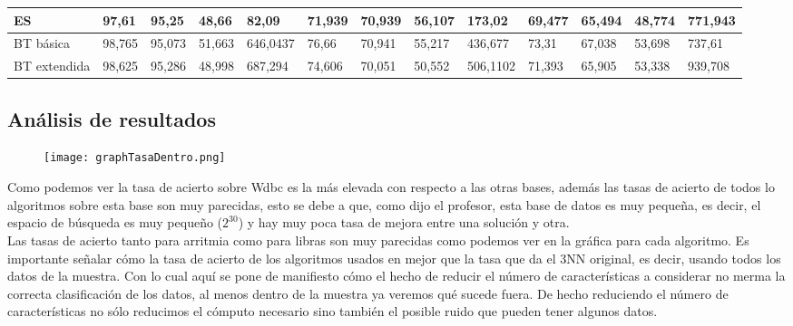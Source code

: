 \documentclass[10pt,a4paper]{article}
\begin{document}
\begin{table}[H]
{\begin{tabular}{lllllllllllll}
\multicolumn{1}{|l|}{ES}                       & \multicolumn{1}{l|}{97,61}         & \multicolumn{1}{l|}{95,25}   & \multicolumn{1}{l|}{48,66}  & \multicolumn{1}{l|}{82,09}        & \multicolumn{1}{l|}{71,939}        & \multicolumn{1}{l|}{70,939}  & \multicolumn{1}{l|}{56,107} & \multicolumn{1}{l|}{173,02}       & \multicolumn{1}{l|}{69,477}        & \multicolumn{1}{l|}{65,494}  & \multicolumn{1}{l|}{48,774} & \multicolumn{1}{l|}{771,943} \\ \hline
\multicolumn{1}{|l|}{BT básica}                & \multicolumn{1}{l|}{98,765}        & \multicolumn{1}{l|}{95,073}  & \multicolumn{1}{l|}{51,663} & \multicolumn{1}{l|}{646,0437}     & \multicolumn{1}{l|}{76,66}         & \multicolumn{1}{l|}{70,941}  & \multicolumn{1}{l|}{55,217} & \multicolumn{1}{l|}{436,677}      & \multicolumn{1}{l|}{73,31}         & \multicolumn{1}{l|}{67,038}  & \multicolumn{1}{l|}{53,698} & \multicolumn{1}{l|}{737,61}  \\ \hline
\multicolumn{1}{|l|}{BT extendida}             & \multicolumn{1}{l|}{98,625}        & \multicolumn{1}{l|}{95,286}  & \multicolumn{1}{l|}{48,998} & \multicolumn{1}{l|}{687,294}      & \multicolumn{1}{l|}{74,606}        & \multicolumn{1}{l|}{70,051}  & \multicolumn{1}{l|}{50,552} & \multicolumn{1}{l|}{506,1102}     & \multicolumn{1}{l|}{71,393}        & \multicolumn{1}{l|}{65,905}  & \multicolumn{1}{l|}{53,338} & \multicolumn{1}{l|}{939,708} \\ \hline
\end{tabular}}
\end{table}

\subsection{\color[rgb]{0.0,0.0,0.51}Análisis de resultados}

\begin{figure}[H]
\centering
\texttt{[image: graphTasaDentro.png]}
\end{figure}

Como podemos ver la tasa de acierto sobre Wdbc es la más elevada con respecto a las otras bases, además las tasas de acierto de todos lo algoritmos sobre esta base son muy parecidas, esto se debe a que, como dijo el profesor, esta base de datos es muy pequeña, es decir, el espacio de búsqueda es muy pequeño ($2^{30}$) y hay muy poca tasa de mejora entre una solución y otra.\\

Las tasas de acierto tanto para arritmia como para libras son muy parecidas como podemos ver en la gráfica para cada algoritmo. Es importante señalar cómo la tasa de acierto de los algoritmos usados en mejor que la tasa que da el 3NN original, es decir, usando todos los datos de la muestra. Con lo cual aquí se pone de manifiesto cómo el hecho de reducir el número de características a considerar no merma la correcta clasificación de los datos, al menos dentro de la muestra ya veremos qué sucede fuera. De hecho reduciendo el número de características no sólo reducimos el cómputo necesario sino también el posible ruido que pueden tener algunos datos.\\
\end{document}
